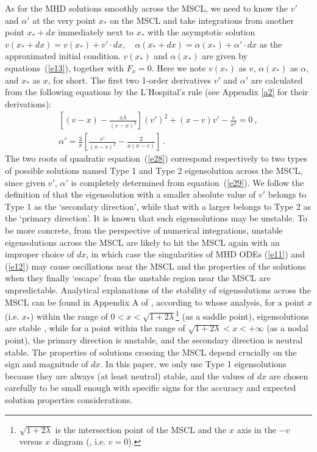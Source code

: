 \documentclass[fleqn,usenatbib]{mnras}
\begin{document}
As for the MHD solutions smoothly across the MSCL, we need to know the $v'$ and $\alpha'$ at the very point $x_{*}$ on the MSCL and take integrations from another point $x_{*}+dx$ immediately next to $x_{*}$ with the asymptotic solution $v(x_{*}+dx)=v(x_{*})+v'\cdot dx, \quad \alpha(x_{*}+dx)=\alpha(x_{*})+\alpha'\cdot dx$ as the approximated initial condition. $v(x_{*})$ and $\alpha(x_{*})$ are given by equations~(\ref{e13}), together with $F_x=0$. Here we note $v(x_{*})$ as $v$, $\alpha(x_{*})$ as $\alpha$, and $x_{*}$ as $x$, for short. The first two 1-order derivatives $v'$ and $\alpha'$ are calculated from the following equations by the L'Hospital's rule (see Appendix \ref{a2} for their derivations):
\begin{gather}
\left[ (v-x)-\frac{x\lambda}{(v-x)^{2}}\right]\left(v'\right)^{2}
 +(x-v)v'-\frac{v}{x^{2}}=0\ ,\label{e28}\\
\alpha'=\frac{2}{x}\left[\frac{v'}
 {(x-v)^{2}}-\frac{2}{x(x-v)}\right]\ .\label{e29}
\end{gather}
The two roots of quadratic equation~(\ref{e28}) correspond respectively to two types of possible solutions named Type 1 and Type 2 eigensolution across the MSCL, since given $v'$, $\alpha'$ is completely determined from equation~(\ref{e29}). We follow the definition of \citet{yuLou2006} that the eigensolution with a smaller absolute value of $v'$ belongs to Type 1 as the `secondary direction', while that with a larger belongs to Type 2 as the `primary direction'. It is known that such eigensolutions may be unstable. %
To be more concrete, from the perspective of numerical integrations, unstable eigensolutions across the MSCL are likely to hit the MSCL again with an improper choice of $dx$, in which case the singularities of MHD ODEs (\ref{e11}) and (\ref{e12}) may cause oscillations near the MSCL and the properties of the solutions when they finally `escape' from the unstable region near the MSCL are unpredictable. Analytical explanations of the stability of eigensolutions across the MSCL can be found in Appendix A of \citet{yuLou2005}, according to whose analysis, for a point $x$ (i.e. $x_{*}$) within the range of $0<x<\sqrt{1+2\lambda}$\footnote{$\sqrt{1+2\lambda}$ is the intersection point of the MSCL and the $x$ axis in the $-v$ versus $x$ diagram (, i.e. $v=0$).} (as a saddle point), eigensolutions are stable %
, while for a point within the range of $\sqrt{1+2\lambda}<x<+\infty$ (as a nodal point), the primary direction is unstable, and the secondary direction is neutral stable. The properties of solutions crossing the MSCL depend crucially on the sign and magnitude of $dx$. In this paper, we only use Type 1 eigensolutions because they are always (at least neutral) stable, and the values of $dx$ are chosen carefully to be small enough with specific signs for the accuracy and expected solution properties considerations. 
\end{document}
